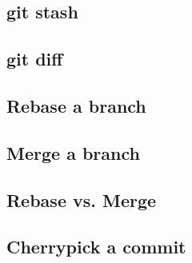 

\subsection{git stash}
\begin{frame}[fragile]
    \subslidetitle
\end{frame}

\subsection{git diff}
\begin{frame}[fragile]
    \subslidetitle
\end{frame}

\subsection{Rebase a branch}
\begin{frame}[fragile]
    \subslidetitle
\end{frame}

\subsection{Merge a branch}
\begin{frame}[fragile]
    \subslidetitle
\end{frame}

\subsection{Rebase vs. Merge}
\begin{frame}[fragile]
    \subslidetitle
\end{frame}

\subsection{Cherrypick a commit}
\begin{frame}[fragile]
    \subslidetitle
\end{frame}

